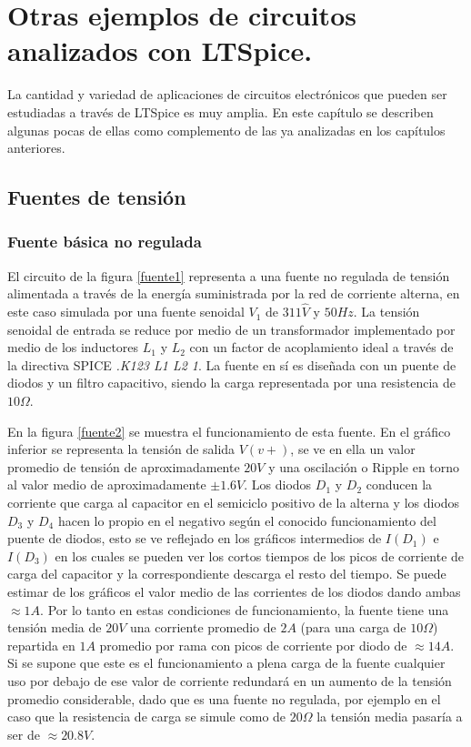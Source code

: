 \chapter{Otras ejemplos de circuitos analizados con LTSpice.}\label{otros}

{\hspace{10pt}} La cantidad y variedad de aplicaciones de circuitos electrónicos que pueden ser estudiadas a través de LTSpice es muy amplia. En este capítulo se describen algunas pocas de ellas como complemento de las ya analizadas en los capítulos anteriores.

\section{Fuentes de tensión}

\subsection{Fuente básica no regulada}

{\hspace{10pt}} El circuito de la figura \ref{fuente1} representa a una fuente no regulada de tensión alimentada a través de la energía suministrada por la red de corriente alterna, en este caso simulada por una fuente senoidal $V_1$ de $311\hat{V}$ y $50Hz$. La tensión senoidal de entrada se reduce por medio de un transformador implementado por medio de los inductores $L_1$ y $L_2$ con un factor de acoplamiento ideal a través de la directiva SPICE \textit{.K123 L1 L2 1}. La fuente en sí es diseñada con un puente de diodos y un filtro capacitivo, siendo la carga representada por una resistencia de $10\Omega$. 

En la figura \ref{fuente2} se muestra el funcionamiento de esta fuente. En el gráfico inferior se representa la tensión de salida $V(v+)$, se ve en ella un valor promedio de tensión de aproximadamente $20V$ y una oscilación o Ripple en torno al valor medio de  aproximadamente $ \pm 1.6V$. Los diodos $D_1$ y $D_2$ conducen la corriente que carga al capacitor en el semiciclo positivo de la alterna y los diodos $D_3$ y $D_4$ hacen lo propio en el negativo según el conocido funcionamiento del puente de diodos, esto se ve reflejado en los gráficos intermedios de $I(D_1)$ e $I(D_3)$ en los cuales se pueden ver los cortos tiempos de los picos de corriente de carga del capacitor y la correspondiente descarga el resto del tiempo. Se puede estimar de los gráficos el valor medio de las corrientes de los diodos dando ambas $\approx 1A$. Por lo tanto en estas condiciones de funcionamiento, la fuente tiene una tensión media de $20V$ una corriente promedio de $2A$ (para una carga de $10\Omega$) repartida en $1A$ promedio por rama con picos de corriente por diodo de $\approx 14A$. Si se supone que este es el funcionamiento a plena carga de la fuente cualquier uso por debajo de ese valor de corriente redundará en un aumento de la tensión promedio considerable, dado que es una fuente no regulada, por ejemplo en el caso que la resistencia de carga se simule como de $20\Omega$ la tensión media pasaría a ser de $\approx20.8V$.     

